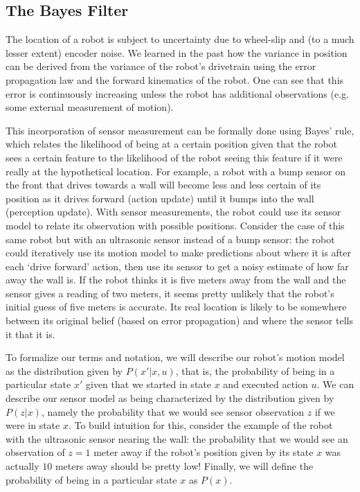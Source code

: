 \subsection{The Bayes Filter}
The location of a robot is subject to uncertainty due to wheel-slip and (to a much lesser extent) encoder noise. We learned in the past how the variance in position can be derived from the variance of the robot's drivetrain using the error propagation law and the forward kinematics of the robot. One can see that this error is continuously increasing unless the robot has additional observations (e.g. some external measurement of motion).

This incorporation of sensor measurement can be formally done using Bayes' rule, which relates the likelihood of being at a certain position given that the robot sees a certain feature to the likelihood of the robot seeing this feature if it were really at the hypothetical location. For example, a robot with a bump sensor on the front that drives towards a wall will become less and less certain of its position as it drives forward (action update) until it bumps into the wall (perception update).
With sensor measurements, the robot could use its sensor model to relate its observation with possible positions. Consider the case of this same robot but with an ultrasonic sensor instead of a bump sensor: the robot could iteratively use its motion model to make predictions about where it is after each `drive forward' action, then use its sensor to get a noisy estimate of how far away the wall is. If the robot thinks it is five meters away from the wall and the sensor gives a reading of two meters, it seems pretty unlikely that the robot's initial guess of five meters is accurate.
Its real location is likely to be somewhere between its original belief (based on error propagation) and where the sensor tells it that it is.

To formalize our terms and notation, we will describe our robot's motion model as the distribution given by $P(x'|x,u)$, that is, the probability of being in a particular state $x'$ given that we started in state $x$ and executed action $u$. We can describe our sensor model as being characterized by the distribution given by $P(z|x)$, namely the probability that we would see sensor observation $z$ if we were in state $x$. To build intuition for this, consider the example of the robot with the ultrasonic sensor nearing the wall: the probability that we would see an observation of $z=1$ meter away if the robot's position given by its state $x$ was actually $10$ meters away should be pretty low! Finally, we will define the probability of being in a particular state $x$ as $P(x)$. 

